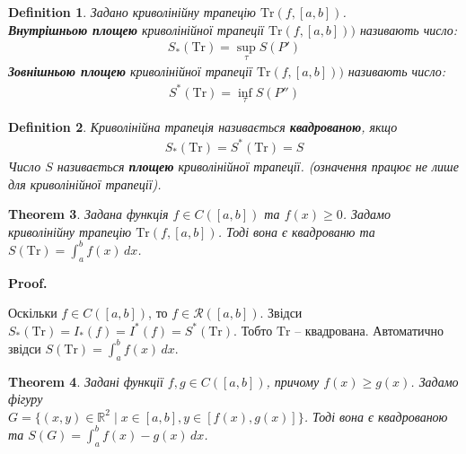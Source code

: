 \documentclass[a4paper, 10pt]{article}
\makeatletter
\def\huge{\displaystyle}
\theoremstyle{theoremdd}
\newtheorem{theorem}{Theorem}[subsection]
\theoremstyle{theoremdd}
\theoremstyle{theoremdd}
\newtheorem{definition}[theorem]{Definition}
\theoremstyle{theoremdd}
\theoremstyle{theoremdd}
\theoremstyle{theoremdd}
\theoremstyle{theoremdd}
\theoremstyle{theoremdd}
\theoremstyle{theoremdd}
\renewenvironment{proof}[1][Proof.\\]{\par
\pushQED{\hfill \qed}%
\normalfont \topsep6\p@\@plus6\p@\relax
\trivlist
\item\relax
{\bfseries
#1\@addpunct{.}}\hspace\labelsep\ignorespaces
}{%
\popQED\endtrivlist\@endpefalse
}
\makeatother
\begin{document}
\begin{definition} Задано криволінійну трапецію $\text{Tr}(f,[a,b])$.\\
\textbf{Внутрішньою площею} криволінійної трапеції $\text{Tr}(f,[a,b]))$ називають число:
\begin{align*}
S_*(\text{Tr}) = \huge\sup_{\tau} S(P')
\end{align*}
\textbf{Зовнішньою площею} криволінійної трапеції $\text{Tr}(f,[a,b]))$ називають число:
\begin{align*}
S^*(\text{Tr}) = \huge\inf_{\tau} S(P'')
\end{align*}
\end{definition}

\begin{definition}
Криволінійна трапеція називається \textbf{квадрованою}, якщо
\begin{align*}
S_*(\text{Tr}) = S^*(\text{Tr}) = S
\end{align*}
Число $S$ називається \textbf{площею} криволінійної трапеції. (означення працює не лише для криволінійної трапеції).
\end{definition}

\begin{theorem}
Задана функція $f \in C([a,b])$ та $f(x) \geq 0$. Задамо криволінійну трапецію $\text{Tr}(f,[a,b])$. Тоді вона є квадрованю та $S(\text{Tr}) = \huge\int_a^b f(x)\,dx$.
\end{theorem}

\begin{proof}
Оскільки $f \in C([a,b])$, то $f \in \mathcal{R}([a,b])$. Звідси $S_*(\text{Tr}) = I_*(f) = I^*(f) = S^*(\text{Tr})$. Тобто $\text{Tr}$ -- квадрована. Автоматично звідси $S(\text{Tr}) = \huge\int_a^b f(x)\,dx$.
\end{proof}

\begin{theorem}
Задані функції $f,g \in C([a,b])$, причому $f(x) \geq g(x)$. Задамо фігуру \\ $G = \{(x,y) \in \mathbb{R}^2 \mid x \in [a,b], y \in [f(x),g(x)]\}$. Тоді вона є квадрованою та $S(G) = \huge\int_a^b f(x)-g(x)\,dx$.\\
\end{theorem}
\end{document}

